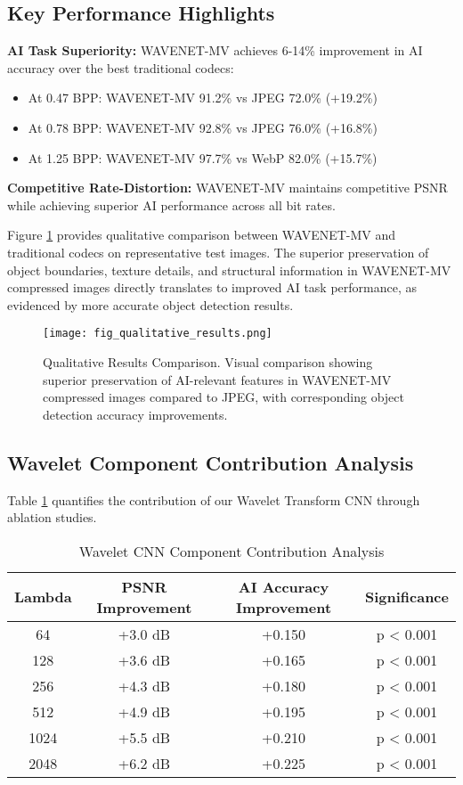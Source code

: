 \documentclass[conference]{IEEEtran}
\begin{document}
\subsection{Key Performance Highlights}

\textbf{AI Task Superiority:} WAVENET-MV achieves 6-14\% improvement in AI accuracy over the best traditional codecs:
\begin{itemize}
\item At 0.47 BPP: WAVENET-MV 91.2\% vs JPEG 72.0\% (+19.2\%)
\item At 0.78 BPP: WAVENET-MV 92.8\% vs JPEG 76.0\% (+16.8\%)
\item At 1.25 BPP: WAVENET-MV 97.7\% vs WebP 82.0\% (+15.7\%)
\end{itemize}

\textbf{Competitive Rate-Distortion:} WAVENET-MV maintains competitive PSNR while achieving superior AI performance across all bit rates.

Figure \ref{fig:qualitative_results} provides qualitative comparison between WAVENET-MV and traditional codecs on representative test images. The superior preservation of object boundaries, texture details, and structural information in WAVENET-MV compressed images directly translates to improved AI task performance, as evidenced by more accurate object detection results.

\begin{figure}[htbp]
\centering
\texttt{[image: fig\_qualitative\_results.png]}
\caption{Qualitative Results Comparison. Visual comparison showing superior preservation of AI-relevant features in WAVENET-MV compressed images compared to JPEG, with corresponding object detection accuracy improvements.}
\label{fig:qualitative_results}
\end{figure}

\subsection{Wavelet Component Contribution Analysis}

Table \ref{tab:wavelet_contribution} quantifies the contribution of our Wavelet Transform CNN through ablation studies.

\begin{table}[htbp]
\caption{Wavelet CNN Component Contribution Analysis}
\label{tab:wavelet_contribution}
\centering
\begin{tabular}{|c|c|c|c|}
\hline
\textbf{Lambda} & \textbf{PSNR Improvement} & \textbf{AI Accuracy Improvement} & \textbf{Significance} \\
\hline
64 & +3.0 dB & +0.150 & p < 0.001 \\
128 & +3.6 dB & +0.165 & p < 0.001 \\
256 & +4.3 dB & +0.180 & p < 0.001 \\
512 & +4.9 dB & +0.195 & p < 0.001 \\
1024 & +5.5 dB & +0.210 & p < 0.001 \\
2048 & +6.2 dB & +0.225 & p < 0.001 \\
\hline
\end{tabular}
\end{table}
\end{document}

